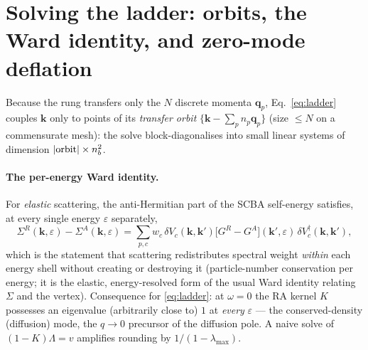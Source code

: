 \documentclass[11pt]{article}
\newcommand{\vk}{\mathbf{k}}
\newcommand{\vq}{\mathbf{q}}
\newcommand{\eps}{\varepsilon}
\begin{document}
\section{Solving the ladder: orbits, the Ward identity, and zero-mode
deflation}
\label{sec:ladder}
Because the rung transfers only the $N$ discrete momenta $\vq_p$,
Eq.~\eqref{eq:ladder} couples $\vk$ only to points of its
\emph{transfer orbit} $\{\vk-\sum_p n_p\vq_p\}$ (size $\le N$ on a
commensurate mesh): the solve block-diagonalises into small linear
systems of dimension $|{\rm orbit}|\times n_b^2$.

\paragraph{The per-energy Ward identity.}
For \emph{elastic} scattering, the anti-Hermitian part of the SCBA
self-energy satisfies, at every single energy $\eps$ separately,
\begin{equation}
\Sigma^{R}(\vk,\eps)-\Sigma^{A}(\vk,\eps)
=\sum_{p,c}w_c\,\delta V_c(\vk,\vk')
\big[G^{R}-G^{A}\big](\vk',\eps)\,
\delta V_c^{\dagger}(\vk,\vk') ,
\label{eq:ward}
\end{equation}
which is the statement that scattering redistributes spectral weight
\emph{within} each energy shell without creating or destroying it
(particle-number conservation per energy; it is the elastic,
energy-resolved form of the usual Ward identity relating $\Sigma$ and
the vertex).  Consequence for \eqref{eq:ladder}: at $\omega=0$ the RA
kernel $K$ possesses an eigenvalue (arbitrarily close to) $1$ at
\emph{every} $\eps$ --- the conserved-density (diffusion) mode, the
$q\to0$ precursor of the diffusion pole.  A naive solve of
$(1-K)\Lambda=v$ amplifies rounding by $1/(1-\lambda_{\max})$.
\end{document}
